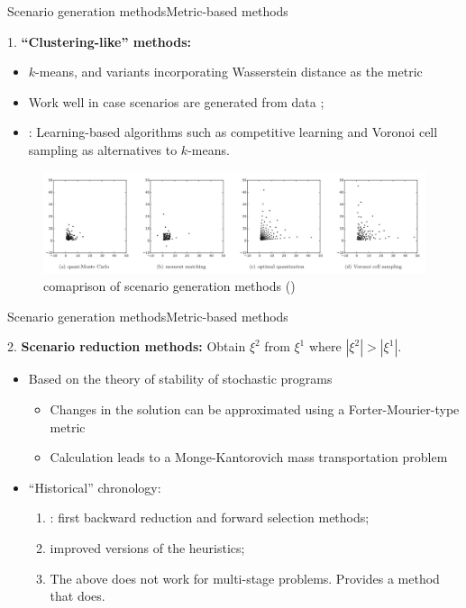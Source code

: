\begin{frame}{Scenario generation methods}{Metric-based methods}
	
		{\color{blue}1.} {\bf ``Clustering-like'' methods:}
		\begin{itemize}
			\item $k$-means, and variants incorporating Wasserstein distance as the metric {\small \cite{condeixa2020wasserstein}}
			\item Work well in case scenarios are generated from \alert{data} {\small\cite{kaut2021scenario}};
			\item {\small \cite{lohndorf2016empirical}}: Learning-based algorithms such as competitive learning and Voronoi cell sampling as alternatives to $k$-means. 
		\end{itemize}
		\vspace{-6pt}	
		\begin{figure}
		\includegraphics[width=\textwidth]{figures/scen_methods(Lohndorf).pdf}
		\caption{comaprison of scenario generation methods (\cite{lohndorf2016empirical})}			
		\end{figure}

	
\end{frame}

\begin{frame}{Scenario generation methods}{Metric-based methods}

		{\color{blue}2.} {\bf Scenario reduction methods:} Obtain $\xi^2$ from $\xi^1$ where $|\xi^2| > |\xi^1|$.
		\begin{itemize}
			\item Based on the theory of stability of stochastic programs {\small \cite{romisch2003stability}}
			\begin{itemize}
				\item Changes in the solution can be approximated using a Forter-Mourier-type metric
				\item Calculation leads to a Monge-Kantorovich mass transportation problem
			\end{itemize}	
			\item ``Historical'' chronology:
			\begin{enumerate}
				\item {\small \cite{dupavcova2003scenario, heitsch2003scenario}}: first \alert{backward reduction} and \alert{forward selection} methods;
				\item {\small \cite{heitsch2007note}} improved versions of the heuristics;
				\item \cite{heitsch2009scenario} The above does not work for \alert{multi-stage} problems. Provides a method that does.  
			\end{enumerate}
		\end{itemize}

\end{frame}

